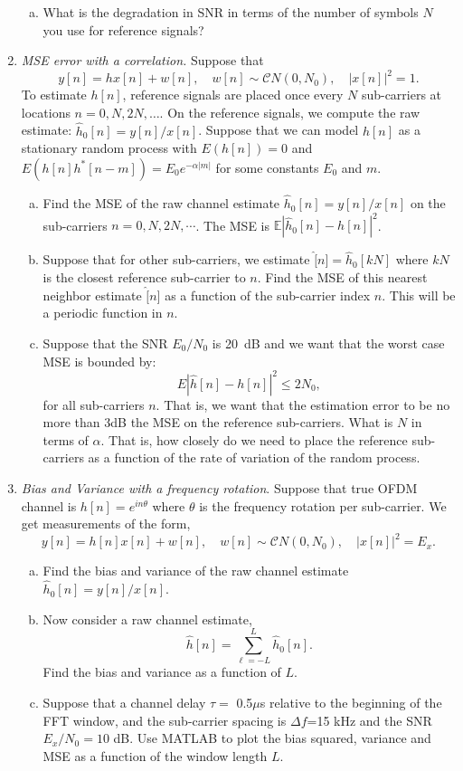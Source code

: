 \documentclass[11pt]{article}
\def\Exp{\mathbb{E}}
\begin{document}
\begin{enumerate}
\begin{enumerate}[(a)]
\item What is the degradation in SNR in terms of the number of symbols $N$ you use for reference signals?
\end{enumerate}


\item \emph{MSE error with a correlation.}  Suppose that
\[
    y[n]=hx[n]+w[n], \quad w[n] \sim {\mathcal CN}(0,N_0), \quad |x[n]|^2 = 1.
\]
To estimate $h[n]$, reference signals are placed once every $N$ sub-carriers
at locations $n=0,N,2N,\ldots$.
On the reference signals, we compute the raw estimate:
$\hat{h}_0[n] = y[n]/x[n]$.
Suppose that we can model $h[n]$ as a stationary random process with $E(h[n])=0$
and $E(h[n]h^*[n-m]) = E_0 e^{-\alpha|m|}$ for some constants $E_0$ and $m$.
\begin{enumerate}[(a)]
  \item Find the MSE of the raw channel estimate $\hat{h}_0[n] = y[n]/x[n]$
  on the sub-carriers $n=0,N,2N,\cdots$.  The MSE is $\Exp|\hat{h}_0[n]-h[n]|^2$.
  \item Suppose that for other sub-carriers, we estimate $\hat[n] = \hat{h}_0[kN]$ where $kN$ is the
  closest reference sub-carrier to $n$.  Find the MSE of this nearest neighbor estimate $\hat[n]$
  as a function of the sub-carrier index $n$.  This will be a periodic function in $n$.
  \item Suppose that the SNR $E_0/N_0$ is 20~dB and we want that the worst case
  MSE is bounded by:
  \[
        E|\hat{h}[n] - h[n]|^2 \leq 2N_0,
  \]
  for all sub-carriers $n$.  That is, we want that the estimation error to be no more than 3dB
  the MSE on the reference sub-carriers.  What is $N$ in terms of $\alpha$.  That is, how closely
  do we need to place the reference sub-carriers as a function of the rate of variation
  of the random process.
\end{enumerate}

\item \emph{Bias and Variance with a frequency rotation}.
Suppose that true OFDM channel is $h[n] = e^{in\theta}$ where $\theta$ is the
frequency rotation per sub-carrier.  We get measurements of the form,
\[
    y[n]=h[n]x[n]+w[n], \quad w[n] \sim {\mathcal CN}(0,N_0), \quad |x[n]|^2 = E_x.
\]
\begin{enumerate}[(a)]
\item Find the bias and variance of the raw channel estimate $\hat{h}_0[n] = y[n]/x[n]$.

\item Now consider a raw channel estimate,
\[
    \hat{h}[n] = \sum_{\ell=-L}^L \hat{h}_0[n].
\]
Find the bias and variance as a function of $L$.

\item Suppose that a channel delay $\tau = $ 0.5$\mu$s relative to the beginning of the FFT window,
and the sub-carrier spacing is $\Delta f$=15 kHz and the SNR $E_x/N_0=10$ dB.  Use MATLAB to plot
the bias squared, variance and MSE as a function of the window length $L$.
\end{enumerate}



\end{enumerate}
\end{document}
